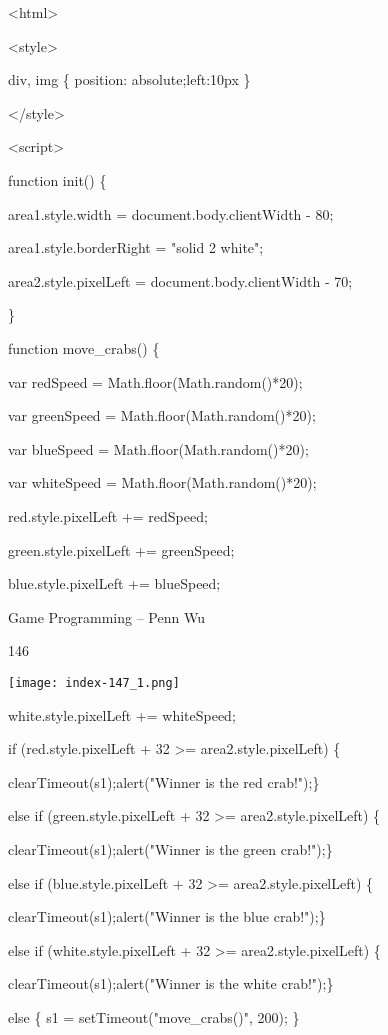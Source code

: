 \documentclass[
]{article}
\begin{document}
\textless html\textgreater{}

\textless style\textgreater{}

div, img \{ position: absolute;left:10px \}

\textless/style\textgreater{}

\textless script\textgreater{}

function init() \{

area1.style.width = document.body.clientWidth - 80;

area1.style.borderRight = "solid 2 white";

area2.style.pixelLeft = document.body.clientWidth - 70;

\}

function move\_crabs() \{

var redSpeed = Math.floor(Math.random()*20);

var greenSpeed = Math.floor(Math.random()*20);

var blueSpeed = Math.floor(Math.random()*20);

var whiteSpeed = Math.floor(Math.random()*20);

red.style.pixelLeft += redSpeed;

green.style.pixelLeft += greenSpeed;

blue.style.pixelLeft += blueSpeed;

Game Programming -- Penn Wu

146

\protect\hypertarget{index_split_009.htmlux5cux23p147}{}{}\texttt{[image: index-147\_1.png]}

white.style.pixelLeft += whiteSpeed;

if (red.style.pixelLeft + 32 \textgreater= area2.style.pixelLeft) \{

clearTimeout(s1);alert("Winner is the red crab!");\}

else if (green.style.pixelLeft + 32 \textgreater= area2.style.pixelLeft)
\{

clearTimeout(s1);alert("Winner is the green crab!");\}

else if (blue.style.pixelLeft + 32 \textgreater= area2.style.pixelLeft)
\{

clearTimeout(s1);alert("Winner is the blue crab!");\}

else if (white.style.pixelLeft + 32 \textgreater= area2.style.pixelLeft)
\{

clearTimeout(s1);alert("Winner is the white crab!");\}

else \{ s1 = setTimeout("move\_crabs()", 200); \}
\end{document}
